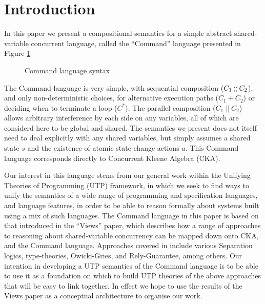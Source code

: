 \section{Introduction}\label{sec:Intro}

In this paper we present a compositional semantics
for a simple abstract shared-variable concurrent language,
called the ``Command'' language
presented in Figure \ref{fig:cmd-syntax}
\begin{figure}
    \caption{Command language syntax}
  \label{fig:cmd-syntax}
\end{figure}
The Command language is very simple,
with sequential composition ($C_1 \mathbin{;\!;} C_2$),
and only non-deterministic choices,
for alternative execution paths ($C_1 + C_2$)
or deciding when to terminate a loop ($C^*$).
The parallel composition ($C_1 \parallel C_2$)
allows arbitrary interference by each side on any variables,
all of which are considerd here to be global and shared.
The semantics we present does not itself need to deal explicitly
with any shared variables,
but simply assumes a shared state $s$
and the existence of atomic state-change actions $a$.
This Command language corresponds directly
to Concurrent Kleene Algebra (CKA)\cite{Hoare2009}.

Our interest in this language stems from our general work within
the Unifying Theories of Programming (UTP) framework\cite{Hoare-He98},
in which we seek to find ways to unify the semantics of a wide range of programming and specification languages, and language features,
in order to be able to reason formally about systems built using a mix of such languages.
The Command language in this paper is based on that introduced in the
``Views'' paper\cite{conf/popl/Dinsdale-YoungBGPY13},
which describes how a range of approaches to reasoning about shared-variable concurrency can be mapped down onto CKA,
and the Command language.
Approaches covered in \cite{conf/popl/Dinsdale-YoungBGPY13} include
various Separation logics\cite{conf/lics/CalcagnoOY07}, type-theories, Owicki-Gries\cite{DBLP:journals/acta/OwickiG76},
and Rely-Guarantee\cite{DBLP:journals/toplas/Jones83}, among others.
Our intention in developing a UTP semantics of the Command language
is to be able to use it as a foundation on which to build UTP
theories of the above approaches that will be easy to link together.
In effect we hope to use the results of the Views paper as a
conceptual architecture to organise our work.

